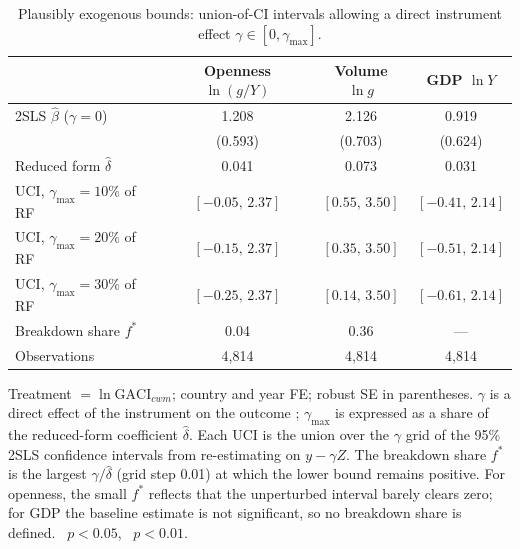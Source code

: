 \begin{table}[H]
\centering
\caption{Plausibly exogenous bounds: union-of-CI intervals allowing a direct
instrument effect $\gamma\in[0,\gamma_{\max}]$.}
\label{tab:conley}
\begin{threeparttable}
\small
\begin{tabular}{lccc}
\toprule
 & Openness $\ln(g/Y)$ & Volume $\ln g$ & GDP $\ln Y$ \\
\midrule
2SLS $\hat\beta$ ($\gamma=0$)   & 1.208\sym{**} & 2.126\sym{***} & 0.919 \\
                                & (0.593) & (0.703) & (0.624) \\
Reduced form $\hat\delta$       & 0.041         & 0.073          & 0.031 \\
\addlinespace
UCI, $\gamma_{\max}=10\%$ of RF & $[-0.05,\,2.37]$ & $[0.55,\,3.50]$ & $[-0.41,\,2.14]$ \\
UCI, $\gamma_{\max}=20\%$ of RF & $[-0.15,\,2.37]$ & $[0.35,\,3.50]$ & $[-0.51,\,2.14]$ \\
UCI, $\gamma_{\max}=30\%$ of RF & $[-0.25,\,2.37]$ & $[0.14,\,3.50]$ & $[-0.61,\,2.14]$ \\
Breakdown share $f^{*}$         & 0.04          & 0.36           & --- \\
\midrule
Observations & 4{,}814 & 4{,}814 & 4{,}814 \\
\bottomrule
\end{tabular}
\begin{tablenotes}\small
\item Treatment $=\ln\mathrm{GACI}_{cwm}$; country and year FE; robust SE in
parentheses. $\gamma$ is a direct effect of the instrument on the outcome
\citep{Conley_2012}; $\gamma_{\max}$ is expressed as a share of the
reduced-form coefficient $\hat\delta$. Each UCI is the union over the
$\gamma$ grid of the 95\% 2SLS confidence intervals from re-estimating on
$y-\gamma Z$. The breakdown share $f^{*}$ is the largest $\gamma/\hat\delta$
(grid step 0.01) at which the lower bound remains positive. For openness, the small $f^{*}$ reflects that the unperturbed interval barely clears zero; for GDP the baseline estimate is not significant, so no breakdown share is defined.
\sym{**}~$p<0.05$, \sym{***}~$p<0.01$.
\end{tablenotes}
\end{threeparttable}
\end{table}


